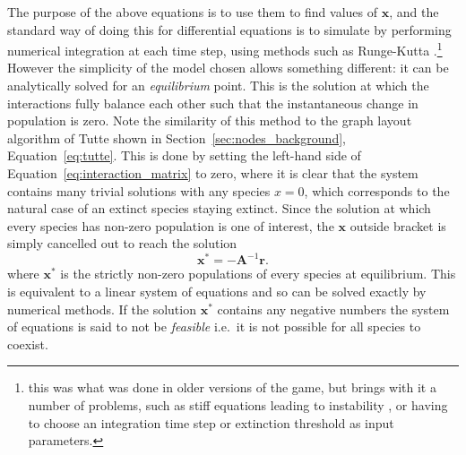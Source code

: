 The purpose of the above equations is to use them to find values of $\mathbf{x}$, and the standard way of doing this for differential equations is to simulate by performing numerical integration at each time step, using methods such as Runge-Kutta \cite{TODO}.\footnote{this was what was done in older versions of the game, but brings with it a number of problems, such as stiff equations leading to instability \cite{TODO}, or having to choose an integration time step or extinction threshold as input parameters.}
However the simplicity of the model chosen allows something different: it can be analytically solved for an \emph{equilibrium} point. This is the solution at which the interactions fully balance each other such that the instantaneous change in population is zero. Note the similarity of this method to the graph layout algorithm of Tutte shown in Section~\ref{sec:nodes_background}, Equation~\eqref{eq:tutte}.
This is done by setting the left-hand side of Equation~\eqref{eq:interaction_matrix} to zero, where it is clear that the system contains many trivial solutions with any species $x=0$, which corresponds to the natural case of an extinct species staying extinct.
Since the solution at which every species has non-zero population is one of interest, the $\mathbf{x}$ outside bracket is simply cancelled out to reach the solution
\begin{equation}
  \mathbf{x^*} = -\mathbf{A}^{-1}\mathbf{r}.
  \label{eq:equilibrium}
\end{equation}
where $\mathbf{x}^*$ is the strictly non-zero populations of every species at equilibrium.
This is equivalent to a linear system of equations and so can be solved exactly by numerical methods.
If the solution $\mathbf{x^*}$ contains any negative numbers the system of equations is said to not be \emph{feasible} i.e.\ it is not possible for all species to coexist.


